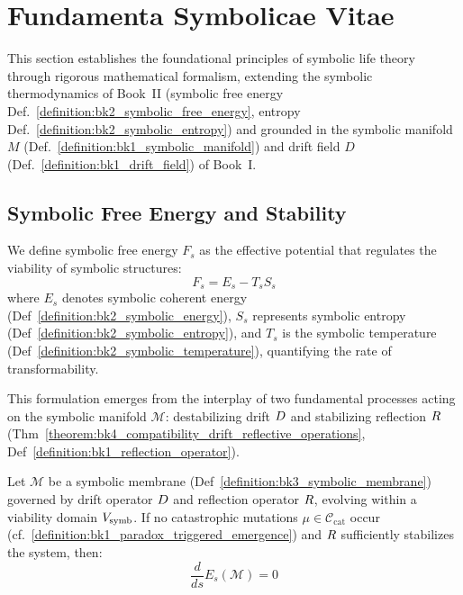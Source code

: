 ﻿\section{Fundamenta Symbolicae Vitae}
\label{sec:bk5_funadmenta_symbolicae_vitae}
This section establishes the foundational principles of symbolic life theory through rigorous mathematical formalism, extending the symbolic thermodynamics of Book~II (symbolic free energy Def.~\ref{definition:bk2_symbolic_free_energy}, entropy Def.~\ref{definition:bk2_symbolic_entropy}) and grounded in the symbolic manifold $M$ (Def.~\ref{definition:bk1_symbolic_manifold}) and drift field $D$ (Def.~\ref{definition:bk1_drift_field}) of Book~I.

\subsection{Symbolic Free Energy and Stability}
\label{subsec:bk5_symbolic_free_energy_and_stability}
We define symbolic free energy $F_s$ as the effective potential that regulates the viability of symbolic structures:
\begin{equation}
F_s = E_s - T_s S_s
\end{equation}
\noindent where $E_s$ denotes symbolic coherent energy (Def~\ref{definition:bk2_symbolic_energy}), 
$S_s$ represents symbolic entropy (Def~\ref{definition:bk2_symbolic_entropy}), 
and $T_s$ is the symbolic temperature (Def~\ref{definition:bk2_symbolic_temperature}), 
quantifying the rate of transformability.

This formulation emerges from the interplay of two fundamental processes acting on the symbolic manifold 
$\mathcal{M}$: destabilizing drift $D$ and stabilizing reflection $R$ 
(Thm~\ref{theorem:bk4_compatibility_drift_reflective_operations}, Def~\ref{definition:bk1_reflection_operator}).

\begin{theorem} 
\label{theorem:bk5_symbolic_coherence_conservation}
Let $\mathcal{M}$ be a symbolic membrane 
(Def~\ref{definition:bk3_symbolic_membrane}) governed by drift operator $D$ 
and reflection operator $R$, evolving within a viability domain $V_{\mathrm{symb}}$. 
If no catastrophic mutations $\mu \in \mathcal{C}_{\mathrm{cat}}$ occur (cf.~\ref{definition:bk1_paradox_triggered_emergence}) and
$R$ sufficiently stabilizes the system, then:
\begin{equation}
\frac{d}{ds} E_s(\mathcal{M}) = 0
\end{equation}
\end{theorem}

